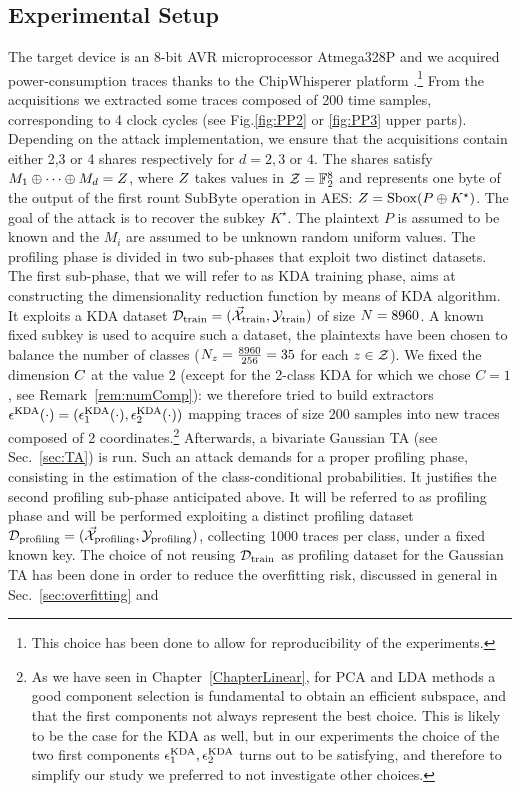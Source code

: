 \subsection{Experimental Setup}\label{sec:experimental_setup}
The target device is an 8-bit AVR microprocessor Atmega328P and we acquired power-consumption traces thanks to the ChipWhisperer platform \cite{o2014chipwhisperer}.\footnote{This choice has been done to allow for reproducibility of the experiments.} From the acquisitions we extracted some traces composed of 200 time samples, corresponding to 4 clock cycles (see Fig.\ref{fig:PP2} or \ref{fig:PP3} upper parts). Depending on the attack implementation, we ensure that the acquisitions contain either 2,3 or 4 shares respectively for $d=2,3$ or $4$. The shares satisfy $M_1 \oplus \dots \oplus M_d = Z$,
where $Z$ takes values in $\mathcal{Z} = \mathbb{F}_2^8$ and represents one byte of the output of the first rount SubByte operation in AES: $Z = \mathrm{Sbox}(P\oplus K^\star)$. The goal of the attack is to recover the subkey $K^\star$. The plaintext $P$ is assumed to be known and the $M_i$ are assumed to be unknown random uniform values. The profiling phase is divided in two sub-phases that exploit two distinct datasets. The first sub-phase, that we will refer to as KDA training phase, aims at constructing the dimensionality reduction function by means of KDA algorithm. It exploits a KDA dataset $\mathcal{D}_{\text{train}} = (\vec{\mathcal{X}}_{\text{train}},\mathcal{Y}_{\text{train}})$ of size $N=8960$.  A known fixed subkey is used to acquire such a dataset, the plaintexts have been chosen to balance the number of classes ($N_{z}=\frac{8960}{256}=35$  for each $z\in \mathcal{Z}$).  We fixed the dimension $C$  at the value $2$ (except for the 2-class KDA for which we chose $C=1$, see Remark~\ref{rem:numComp}): we therefore tried to build extractors $\epsilon^{\mathrm{KDA}}(\cdot) = (\epsilon^{\mathrm{KDA}}_1(\cdot), \epsilon^{\mathrm{KDA}}_2(\cdot))$ mapping traces of size 200 samples into new traces composed of 2 coordinates.\footnote{As we have seen in Chapter~\ref{ChapterLinear}, for PCA and LDA methods a good component selection is fundamental to obtain an efficient subspace, and that the first components not always represent the best choice. This is likely to be the case for the KDA as well, but in our experiments the choice of the two first components $\epsilon^{\mathrm{KDA}}_1, \epsilon^{\mathrm{KDA}}_2$ turns out to be satisfying, and therefore to simplify our study we preferred to not investigate other choices.} Afterwards, a bivariate Gaussian TA (see Sec.~\ref{sec:TA}) is run. Such an attack demands for a proper profiling phase, consisting in the estimation of the  class-conditional probabilities. It justifies the second profiling sub-phase anticipated above. It will be referred to as profiling phase and will be performed exploiting a distinct profiling dataset  $\mathcal{D}_{\text{profiling}} = (\vec{\mathcal{X}}_{\text{profiling}},\mathcal{Y}_{\text{profiling}})$, collecting 1000 traces per class, under a fixed known key. The choice of not reusing $\mathcal{D}_{\text{train}}$ as profiling dataset for the Gaussian TA has been done in order to reduce the overfitting risk, discussed in general in Sec.~\ref{sec:overfitting} and 